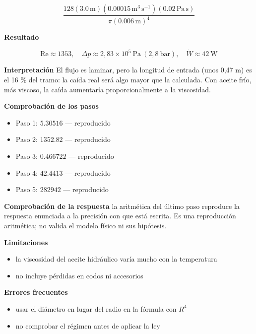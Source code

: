 \documentclass[10pt,openany]{book}
\begin{document}
\begin{tcolorbox}[title={Problema resuelto}, studiumworked, breakable]
\[
\frac{128 \left(3.0\,\mathrm{m}\right) \left(0.00015\,\mathrm{m}^{3}\,\mathrm{s}^{-1}\right) \left(0.02\,\mathrm{Pa}\,\mathrm{s}\right)}{\pi \left(0.006\,\mathrm{m}\right)^{4}}
\]

\noindent\textbf{Resultado}

\[
\mathrm{Re} \approx 1353,\quad \Delta p \approx 2{,}83\times 10^{5}\ \mathrm{Pa}\ (2{,}8\ \mathrm{bar}),\quad \dot W \approx 42\ \mathrm{W}
\]

\noindent\textbf{Interpretación}
El flujo es laminar, pero la longitud de entrada (unos 0,47 m) es el 16 \% del tramo: la caída real será algo mayor que la calculada. Con aceite frío, más viscoso, la caída aumentaría proporcionalmente a la viscosidad.

\noindent\textbf{Comprobación de los pasos}
\begin{itemize}
\item Paso 1: $5.30516$ — reproducido
\item Paso 2: $1352.82$ — reproducido
\item Paso 3: $0.466722$ — reproducido
\item Paso 4: $42.4413$ — reproducido
\item Paso 5: $282942$ — reproducido
\end{itemize}

\noindent\textbf{Comprobación de la respuesta} la aritmética del último paso reproduce la respuesta enunciada a la precisión con que está escrita. Es una reproducción aritmética; no valida el modelo físico ni sus hipótesis.

\noindent\textbf{Limitaciones}
\begin{itemize}
\item la viscosidad del aceite hidráulico varía mucho con la temperatura
\item no incluye pérdidas en codos ni accesorios
\end{itemize}

\noindent\textbf{Errores frecuentes}
\begin{itemize}
\item usar el diámetro en lugar del radio en la fórmula con \(R^4\)
\item no comprobar el régimen antes de aplicar la ley
\end{itemize}
\end{tcolorbox}
\end{document}
